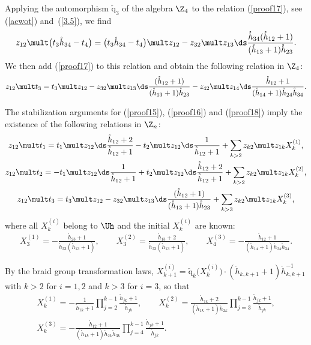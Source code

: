 \documentclass[pdftex]{sigma}
\def\nplus{\mathfrak{n}}\def\nn{\nonumber}\def\nin{\noindent}
\def\q{\check{\mathrm q}}\def\Q{\mathrm{Q}}\def\r#1{(\ref{#1})}\let\rf=\r
\def\s{z}\def\S{\mathrm {S}}\def\si{\sigma}\def\Sp{\S^{\nplus}}\def\sy{\acute{\sigma}}\def\th{\mathring{h}}
\numberwithin{equation}{section}
\begin{document}
Applying the automorphism $\q_3$ of the algebra $\Z_4$ to the relation \rf{proof17}, see \rf{acwot} and~\rf{3.5}, we f\/ind
\begin{gather*}
\s_{12}\mult\big(t_3\th_{34}-t_4\big)=\big(t_3\th_{34}-t_4\big)\mult \s_{12}
-\s_{32}\mult\s_{13}  {\ds\frac{\th_{34}(\th_{12}+1)}{(\th_{13}+1)\th_{23}}}  .
\end{gather*}
We then add \rf{proof17} to this relation  and obtain the following relation in $\Z_4$:
\begin{gather}\label{proof18}
\s_{12}\mult t_3=t_3\mult\s_{12}
-\s_{32}\mult \s_{13}  {\ds\frac{(\th_{12}+1)}{(\th_{13}+1)\th_{23}}}-
\s_{42}\mult\s_{14}  {\ds\frac{\th_{12}+1}{(\th_{14}+1)\th_{24}\th_{34}}}  .
\end{gather}

The stabilization arguments for \rf{proof15}, \rf{proof16} and \rf{proof18} imply the existence of the following relations in $\Z_n$:
\begin{gather}\label{proof19}\s_{12}\mult t_1 =t_1\mult\s_{12}  {\ds\frac{\th_{12}+2}{\th_{12}+1}}-
t_2\mult\s_{12}  {\ds\frac{1}{\th_{12}+1}}+\sum_{k>2}\s_{k2}\mult\s_{1k}X_k^{(1)},\\
 \label{proof20}\s_{12}\mult t_2 =-t_1\mult\s_{12}  {\ds\frac{1}{\th_{12}+1}}+t_2\mult\s_{12}  {\ds\frac{\th_{12}+2}{\th_{12}+1}}
+\sum_{k>2}\s_{k2}\mult\s_{1k}X_k^{(2)},
\\
\label{proof21}\s_{12}\mult t_3 =t_3\mult\s_{12}-\s_{32}\mult\s_{13}  {\ds\frac{(\th_{12}+1)}{(\th_{13}+1)\th_{23}}}
+\sum_{k>3}\s_{k2}\mult\s_{1k}X_k^{(3)},
\end{gather}
where all $X_k^{(i)}$ belong to $\Uh$ and the initial $X_k^{(i)}$ are known:
\begin{gather*} X_3^{(1)} =-\frac{\th_{23}+1}{\th_{23}(\th_{13}+1)}  ,\qquad
X_3^{(2)} =\frac{\th_{13}+2}{\th_{23}(\th_{13}+1)}  ,\qquad
X_4^{(3)} =-\frac{\th_{12}+1}{(\th_{14}+1)\th_{24}\th_{34}}  .
\end{gather*}

By the braid group transformation laws, $X_{k+1}^{(i)}=\q_k\big(X_k^{(i)}\big)\cdot(\th_{k,k+1}+1)\th_{k,k+1}^{-1}$
with $k>2$ for $i=1,2$ and $k>3$ for $i=3$, so that
\begin{gather*}%
X_k^{(1)}=-\frac{1}{\th_{1k}+1}\prod_{j=2}^{k-1}\frac{\th_{jk}+1}{\th_{jk}} ,\qquad
X_k^{(2)}=\frac{\th_{1k}+2}{(\th_{1k}+1)\th_{2k}}\prod_{j=3}^{k-1}
\frac{\th_{jk}+1}{\th_{jk}}  ,\\
X_k^{(3)}=-\frac{\th_{12}+1}{(\th_{1k}+1)\th_{2k}\th_{3k}}\prod_{j=4}^{k-1}
\frac{\th_{jk}+1}{\th_{jk}}  .
\end{gather*}
\end{document}
